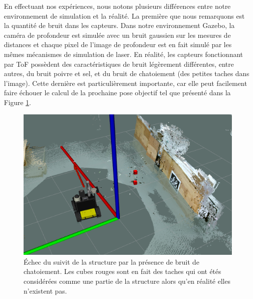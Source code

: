 En effectuant nos expériences, nous notons plusieurs différences entre notre environnement de simulation et la réalité. La première que nous remarquons est la quantité de bruit dans les capteurs. Dans notre environnement Gazebo, la caméra de profondeur est simulée avec un bruit gaussien sur les mesures de distances et chaque pixel de l'image de profondeur est en fait simulé par les mêmes mécanismes de simulation de laser. En réalité, les capteurs fonctionnant par ToF possèdent des caractéristiques de bruit légèrement différentes, entre autres, du bruit poivre et sel, et du bruit de chatoiement (des petites taches dans l'image). Cette dernière est particulièrement importante, car elle peut facilement faire échouer le calcul de la prochaine pose objectif tel que présenté dans la Figure \ref{fig:speckle_fail}.

\begin{figure}[!th]
  \centering
  \includegraphics[width=0.7\linewidth]{images/speckle.png}
  \caption[Échec du suivit de la structure par la présence de bruit de chatoiement]{Échec du suivit de la structure par la présence de bruit de chatoiement. Les cubes rouges sont en fait des taches qui ont étés considérées comme une partie de la structure alors qu'en réalité elles n'existent pas.}
  \label{fig:speckle_fail}
\end{figure}

